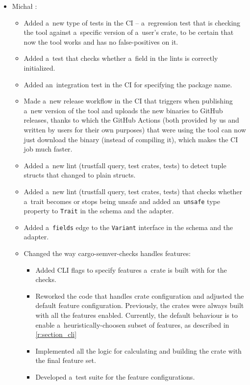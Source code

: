 \documentclass[licencjacka,en]{pracamgr}
\begin{document}
\begin{itemize}
	\item Michał \cite{responsibilities-michal}:
		\begin{itemize}
			\item Added a~new type of tests in the CI -- a~regression test that is checking
				the tool against a~specific version of a~user's crate, to be certain that now
				the tool works and has no false-positives on it.
			\item Added a~test that checks whether a~field in the lints is correctly initialized.
			\item Added an~integration test in the CI for specifying the package name.
			\item Made a~new release workflow in the CI that triggers when publishing a~new version
				of the tool and uploads the new binaries to GitHub releases, thanks to which
				the GitHub Actions (both provided by us and written by users for their own purposes)
				that were using the tool can now just download the binary (instead of compiling it),
				which makes the CI job much faster.
			\item Added a~new lint (trustfall query, test crates, tests) to detect tuple structs
				that changed to plain structs.
			\item Added a~new lint (trustfall query, test crates, tests) that checks whether
				a~trait becomes or stops being unsafe and added an~\texttt{unsafe} type property
				to \texttt{Trait} in the schema and the adapter.
			\item Added a~\texttt{fields} edge to the \texttt{Variant} interface in the schema
				and the adapter.
                        \item Changed the way cargo-semver-checks handles features:
                        \begin{itemize}
                            \item Added CLI flags to specify features a~crate is built with for the checks.
                            \item Reworked the code that handles crate configuration and adjusted
                                    the default feature configuration.
                                    Previously, the crates were always built with all the features enabled.
                                    Currently, the default behaviour is to enable a~heuristically-choosen
                                    subset of features, as described in \ref{r:section_cli}
                            \item Implemented all the logic for calculating and building the crate
                                    with the final feature set.
                            \item Developed a~test suite for the feature configurations.
                        \end{itemize}


\end{itemize}
\end{itemize}
\end{document}
